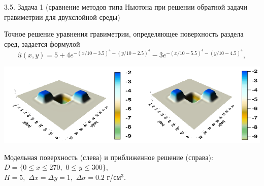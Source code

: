\documentclass[10pt,pdf, mathserif, hyperref={unicode}]{beamer}
\begin{document}
\begin{frame}{\small 3.5. Задача 1 (сравнение методов типа Ньютона при решении обратной задачи гравиметрии для двухслойной среды)}
	
	Точное решение уравнения гравиметрии, определяющее поверхность раздела сред, задается формулой
	$$\hat{u}(x,y)=5+4e^{-(x/10-3.5)^4-(y/10-2.5)^4}-3e^{-(x/10-5.5)^4-(y/10-4.5)^4},$$
	\centering
		
	\includegraphics[width=\textwidth, height=0.35\textheight]{gravy_kiev2014.png}
	
	Модельная поверхность (слева) и приближенное решение (справа): $D=\{0\leqslant x\leqslant 270, \,\,0\leqslant y\leqslant 300\}$, \\ $  H=5,\,\,\Delta x=\Delta y=1,\,\,\Delta\sigma=0.2$ г/см$^3$.
\end{frame}
\end{document}
